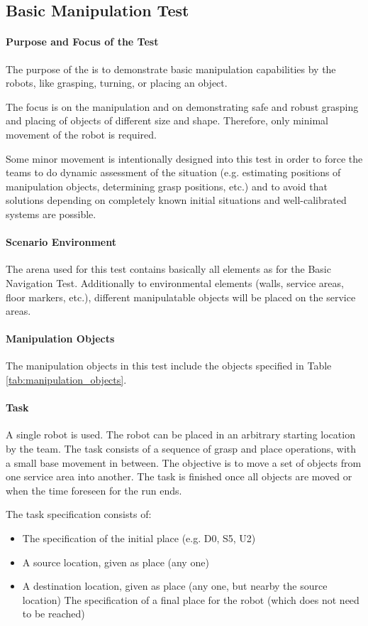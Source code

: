 \newpage
\subsection{Basic Manipulation Test}

\paragraph{Purpose and Focus of the Test}
The purpose of the  is to demonstrate basic manipulation capabilities by the robots, like grasping, turning, or placing an object.
\par
The focus is on the manipulation and on demonstrating safe and robust grasping and placing of objects of different size and shape. Therefore, only minimal movement of the robot is required.
\par
Some minor movement is intentionally designed into this test in order to force the teams to do dynamic assessment of the situation (e.g. estimating positions of manipulation objects, determining grasp positions, etc.) and to avoid that solutions depending on completely known initial situations and well-calibrated systems are possible.

\paragraph{Scenario Environment}
The arena used for this test contains basically all elements as for the Basic Navigation Test. Additionally to environmental elements (walls, service areas, floor markers, etc.), different manipulatable objects will be placed on the service areas.

\paragraph{Manipulation Objects}
The manipulation objects in this test include the objects specified in Table \ref{tab:manipulation_objects}.

\paragraph{Task}
A single robot is used. The robot can be placed in an arbitrary starting location by the team. The task consists of a sequence of grasp and place operations, with a small base movement in between. The objective is to move a set of objects from one service area into another. The task is finished once all objects are moved or when the time foreseen for the run ends.
\par
The task specification consists of:
\begin{itemize}
	\item The specification of the initial place (e.g. D0, S5, U2)
	\item A source location, given as place (any one)
	\item A destination location, given as place (any one, but nearby the source location)
The specification of a final place for the robot (which does not need to be reached)
\end{itemize}

